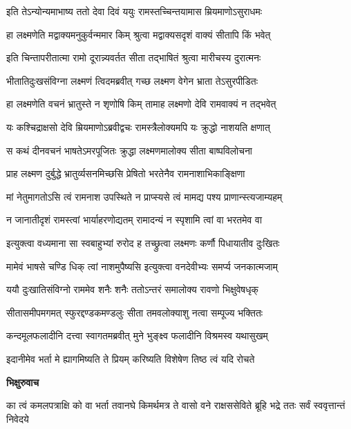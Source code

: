 \twolineshloka
{इति तेऽन्योन्यमाभाष्य ततो देवा दिवं ययुः}
{रामस्तच्चिन्तयामास म्रियमाणोऽसुराधमः} %

\twolineshloka
{हा लक्ष्मणेति मद्वाक्यमनुकुर्वन्ममार किम्}
{श्रुत्वा मद्वाक्यसदृशं वाक्यं सीतापि किं भवेत्} %

\twolineshloka
{इति चिन्तापरीतात्मा रामो दूरान्न्यवर्तत}
{सीता तद्भाषितं श्रुत्वा मारीचस्य दुरात्मनः} %

\twolineshloka
{भीतातिदुःखसंविग्ना लक्ष्मणं त्विदमब्रवीत्}
{गच्छ लक्ष्मण वेगेन भ्राता तेऽसुरपीडितः} %

\twolineshloka
{हा लक्ष्मणेति वचनं भ्रातुस्ते न शृणोषि किम्}
{तामाह लक्ष्मणो देवि रामवाक्यं न तद्भवेत्} %

\twolineshloka
{यः कश्चिद्राक्षसो देवि म्रियमाणोऽब्रवीद्वचः}
{रामस्त्रैलोक्यमपि यः क्रुद्धो नाशयति क्षणात्} %

\twolineshloka
{स कथं दीनवचनं भाषतेऽमरपूजितः}
{क्रुद्धा लक्ष्मणमालोक्य सीता बाष्पविलोचना} %

\twolineshloka
{प्राह लक्ष्मण दुर्बुद्धे भ्रातुर्व्यसनमिच्छसि}
{प्रेषितो भरतेनैव रामनाशाभिकाङ्क्षिणा} %

\twolineshloka
{मां नेतुमागतोऽसि त्वं रामनाश उपस्थिते}
{न प्राप्स्यसे त्वं मामद्य पश्य प्राणान्स्त्यजाम्यहम्} %

\twolineshloka
{न जानातीदृशं रामस्त्वां भार्याहरणोद्यतम्}
{रामादन्यं न स्पृशामि त्वां वा भरतमेव वा} %

\twolineshloka
{इत्युक्त्वा वध्यमाना सा स्वबाहुभ्यां रुरोद ह}
{तच्छ्रुत्वा लक्ष्मणः कर्णौ पिधायातीव दुःखितः} %

\twolineshloka
{मामेवं भाषसे चण्डि धिक् त्वां नाशमुपैष्यसि}
{इत्युक्त्वा वनदेवीभ्यः समर्प्य जनकात्मजाम्} %

\twolineshloka
{ययौ दुःखातिसंविग्नो राममेव शनैः शनैः}
{ततोऽन्तरं समालोक्य रावणो भिक्षुवेषधृक्} %

\twolineshloka
{सीतासमीपमगमत् स्फुरद्दण्डकमण्डलुः}
{सीता तमवलोक्याशु नत्वा सम्पूज्य भक्तितः} %

\twolineshloka
{कन्दमूलफलादीनि दत्त्वा स्वागतमब्रवीत्}
{मुने भुङ्क्ष्व फलादीनि विश्रमस्व यथासुखम्} %

\twolineshloka
{इदानीमेव भर्ता मे ह्यागमिष्यति ते प्रियम्}
{करिष्यति विशेषेण तिष्ठ त्वं यदि रोचते} %

\textbf{भिक्षुरुवाच}

\threelineshloka
{का त्वं कमलपत्राक्षि को वा भर्ता तवानघे}
{किमर्थमत्र ते वासो वने राक्षससेविते}
{ब्रूहि भद्रे ततः सर्वं स्ववृत्तान्तं निवेदये} %

